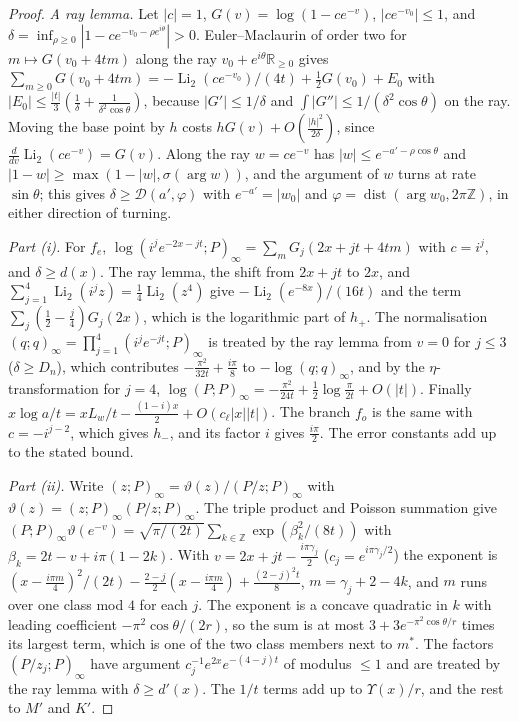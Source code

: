\documentclass[11pt]{article}
\theoremstyle{plain}
\theoremstyle{definition}
\theoremstyle{remark}
\newcommand{\Z}{\mathbb{Z}}
\newcommand{\R}{\mathbb{R}}
\theoremstyle{plain}\newtheorem*{maintheorem}{Main Theorem}
\begin{document}
\begin{proof}
\emph{A ray lemma.} Let $|c|=1$, $G(v)=\log(1-ce^{-v})$, $|ce^{-v_0}|\le1$, and
$\delta=\inf_{\rho\ge0}|1-ce^{-v_0-\rho e^{i\theta}}|>0$. Euler--Maclaurin of order two for $m\mapsto G(v_0+4tm)$
along the ray $v_0+e^{i\theta}\R_{\ge0}$ gives
$\sum_{m\ge0}G(v_0+4tm)=-\operatorname{Li}_2(ce^{-v_0})/(4t)+\frac12G(v_0)+E_0$ with
$|E_0|\le\frac{|t|}3(\frac1\delta+\frac1{\delta^2\cos\theta})$, because $|G'|\le1/\delta$ and
$\int|G''|\le1/(\delta^2\cos\theta)$ on the ray. Moving the base point by $h$ costs
$hG(v)+O(\frac{|h|^2}{2\delta})$, since $\frac d{dv}\operatorname{Li}_2(ce^{-v})=G(v)$. Along the ray
$w=ce^{-v}$ has $|w|\le e^{-a'-\rho\cos\theta}$ and $|1-w|\ge\max(1-|w|,\sigma(\arg w))$, and the argument of
$w$ turns at rate $\sin\theta$; this gives $\delta\ge\mathcal D(a',\varphi)$ with $e^{-a'}=|w_0|$ and
$\varphi=\operatorname{dist}(\arg w_0,2\pi\Z)$, in either direction of turning.

\emph{Part \textup{(i)}.} For $f_e$, $\log(i^je^{-2x-jt};P)_\infty=\sum_mG_j(2x+jt+4tm)$ with $c=i^j$, and
$\delta\ge d(x)$. The ray lemma, the shift from $2x+jt$ to $2x$, and
$\sum_{j=1}^4\operatorname{Li}_2(i^jz)=\frac14\operatorname{Li}_2(z^4)$ give $-\operatorname{Li}_2(e^{-8x})/(16t)$ and
the term $\sum_j(\frac12-\frac j4)G_j(2x)$, which is the logarithmic part of $h_+$. The normalisation
$(q;q)_\infty=\prod_{j=1}^4(i^je^{-jt};P)_\infty$ is treated by the ray lemma from $v=0$ for $j\le3$
($\delta\ge D_n$), which contributes $-\frac{\pi^2}{32t}+\frac{i\pi}8$ to $-\log(q;q)_\infty$, and by the $\eta$-transformation for $j=4$,
$\log(P;P)_\infty=-\frac{\pi^2}{24t}+\frac12\log\frac\pi{2t}+O(|t|)$. Finally
$x\log a/t=xL_w/t-\frac{(1-i)x}2+O(c_\ell|x||t|)$. The branch $f_o$ is the same with $c=-i^{j-2}$, which gives
$h_-$, and its factor $i$ gives $\frac{i\pi}2$. The error constants add up to the stated bound.

\emph{Part \textup{(ii)}.} Write $(z;P)_\infty=\vartheta(z)/(P/z;P)_\infty$ with
$\vartheta(z)=(z;P)_\infty(P/z;P)_\infty$. The triple product and Poisson summation give
$(P;P)_\infty\vartheta(e^{-v})=\sqrt{\pi/(2t)}\sum_{k\in\Z}\exp(\beta_k^2/(8t))$ with
$\beta_k=2t-v+i\pi(1-2k)$. With $v=2x+jt-\frac{i\pi\gamma_j}2$ ($c_j=e^{i\pi\gamma_j/2}$) the exponent is
$(x-\frac{i\pi m}4)^2/(2t)-\frac{2-j}2(x-\frac{i\pi m}4)+\frac{(2-j)^2t}8$, $m=\gamma_j+2-4k$, and $m$ runs
over one class mod $4$ for each $j$. The exponent is a concave quadratic in $k$ with leading coefficient
$-\pi^2\cos\theta/(2r)$, so the sum is at most $3+3e^{-\pi^2\cos\theta/r}$ times its largest term, which is one
of the two class members next to $m^\ast$. The factors $(P/z_j;P)_\infty$ have argument
$c_j^{-1}e^{2x}e^{-(4-j)t}$ of modulus $\le1$ and are treated by the ray lemma with $\delta\ge d'(x)$.
The $1/t$ terms add up to $\Upsilon(x)/r$, and the rest to $M'$ and $K'$.


\end{proof}
\end{document}
